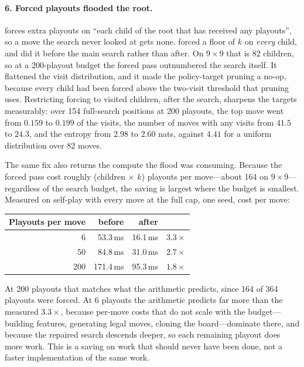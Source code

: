 \paragraph{6. Forced playouts flooded the root.}
 forces extra playouts on ``each child of the
root that has received any playouts'', so a move the search never looked at gets
none. \gofer{} forced a floor of $k$ on \emph{every} child, and did it before the
main search rather than after. On $9\times9$ that is 82 children, so at a
200-playout budget the forced pass outnumbered the search itself. It flattened
the visit distribution, and it made the policy-target pruning a no-op, because
every child had been forced above the two-visit threshold that pruning uses.
Restricting forcing to visited children, after the search, sharpens the targets
measurably: over 154 full-search positions at 200 playouts, the top move went
from $0.159$ to $0.199$ of the visits, the number of moves with any visits from
$41.5$ to $24.3$, and the entropy from $2.98$ to $2.60$ nats, against $4.41$ for
a uniform distribution over 82 moves.

The same fix also returns the compute the flood was consuming. Because the
forced pass cost roughly (children $\times$ $k$) playouts per move---about 164 on
$9\times9$---regardless of the search budget, the saving is largest where the
budget is smallest. Measured on self-play with every move at the full cap, one
seed, cost per move:

\begin{center}\small
\begin{tabular}{@{}rrrr@{}}
\toprule
Playouts per move & before & after & \\
\midrule
6   & 53.3\,ms & 16.1\,ms & $3.3\times$ \\
50  & 84.8\,ms & 31.0\,ms & $2.7\times$ \\
200 & 171.4\,ms & 95.3\,ms & $1.8\times$ \\
\bottomrule
\end{tabular}
\end{center}

\noindent At 200 playouts that matches what the arithmetic predicts, since 164 of
364 playouts were forced. At 6 playouts the arithmetic predicts far more than the
measured $3.3\times$, because per-move costs that do not scale with the budget---
building features, generating legal moves, cloning the board---dominate there,
and because the repaired search descends deeper, so each remaining playout does
more work. This is a saving on work that should never have been done, not a
faster implementation of the same work.

